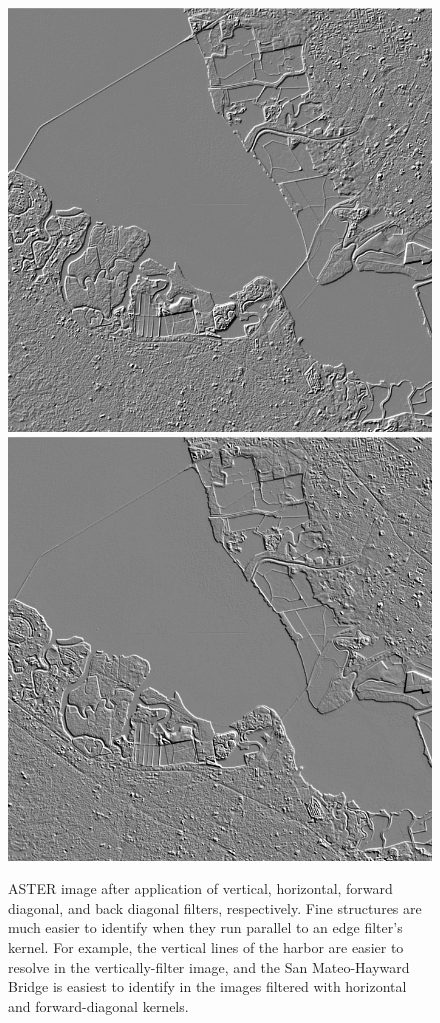 \documentclass[12pt]{article}
\begin{document}
\begin{figure}[h!]
    \vspace{.2em}
    \includegraphics[width=.48\linewidth]{figures/p8/aster_diagonal1.png}
    \includegraphics[width=.48\linewidth]{figures/p8/aster_diagonal2.png}
    \caption{ASTER image after application of vertical, horizontal, forward diagonal, and back diagonal filters, respectively. Fine structures are much easier to identify when they run parallel to an edge filter's kernel. For example, the vertical lines of the harbor are easier to resolve in the vertically-filter image, and the San Mateo-Hayward Bridge is easiest to identify in the images filtered with horizontal and forward-diagonal kernels.}
    \label{p8_edgesteps}
\end{figure}
\end{document}
